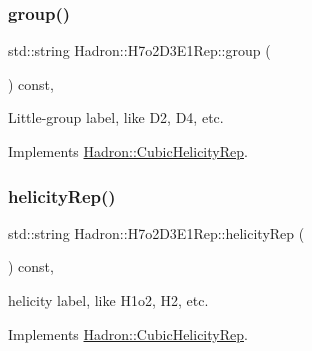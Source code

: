 \mbox{\label{structHadron_1_1H7o2D3E1Rep_a9a25c1c49d874a36ad6a3c82522d0482}} 
\subsubsection{\texorpdfstring{group()}{group()}\hspace{0.1cm}{\footnotesize\ttfamily [5/5]}}
{\footnotesize\ttfamily std\+::string Hadron\+::\+H7o2\+D3\+E1\+Rep\+::group (\begin{DoxyParamCaption}{ }\end{DoxyParamCaption}) const\hspace{0.3cm}{\ttfamily [inline]}, {\ttfamily [virtual]}}

Little-\/group label, like D2, D4, etc. 

Implements \mbox{\hyperlink{structHadron_1_1CubicHelicityRep_a101a7d76cd8ccdad0f272db44b766113}{Hadron\+::\+Cubic\+Helicity\+Rep}}.

\mbox{\label{structHadron_1_1H7o2D3E1Rep_a3e5ff6ed7ad90eeab64132f0434cdde5}} 
\subsubsection{\texorpdfstring{helicityRep()}{helicityRep()}\hspace{0.1cm}{\footnotesize\ttfamily [1/3]}}
{\footnotesize\ttfamily std\+::string Hadron\+::\+H7o2\+D3\+E1\+Rep\+::helicity\+Rep (\begin{DoxyParamCaption}{ }\end{DoxyParamCaption}) const\hspace{0.3cm}{\ttfamily [inline]}, {\ttfamily [virtual]}}

helicity label, like H1o2, H2, etc. 

Implements \mbox{\hyperlink{structHadron_1_1CubicHelicityRep_af1096946b7470edf0a55451cc662f231}{Hadron\+::\+Cubic\+Helicity\+Rep}}.

\mbox{\label{structHadron_1_1H7o2D3E1Rep_a3e5ff6ed7ad90eeab64132f0434cdde5}} 
